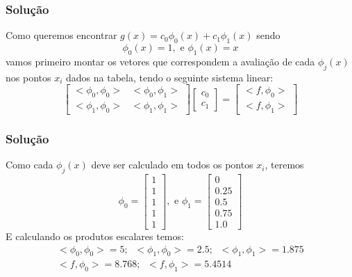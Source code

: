 \documentclass{beamer}
\theoremstyle{mystyle}
\begin{document}
	\begin{frame}
		\frametitle{Solução}
		Como queremos encontrar $ g(x) = c_{0}\phi_{0}(x) +c_{1}\phi_{1}(x) $ sendo
		\begin{equation*}
			\phi_{0}(x) = 1, \mbox{ e } \phi_{1}(x) = x
		\end{equation*}
		vamos primeiro montar os vetores que correspondem a avaliação de cada $ \phi_{j}(x) $ nos pontos $ x_{i} $ dados na tabela, tendo o seguinte sistema linear:
		\begin{equation*}
			\left[ \begin{array}{cc}
				<\phi_{0},\phi_{0}> & <\phi_{0},\phi_{1}> \\
				<\phi_{1},\phi_{0}> & <\phi_{1},\phi_{1}> 
			\end{array}\right]
			\left[ \begin{array}{c}
				c_{0}\\
				c_{1}
			\end{array} \right]
			= \left[ \begin{array}{c}
				<f,\phi_{0}>\\
				<f,\phi_{1}>
			\end{array} \right]
		\end{equation*}
	\end{frame}

	\begin{frame}
		\frametitle{Solução}
		Como cada $ \phi_{j}(x) $ deve ser calculado em todos os pontos $ x_{i} $, teremos 
		\begin{equation*}
			\phi_{0} = \left[ \begin{array}{c}
				1\\
				1\\
				1\\
				1\\
				1
			\end{array} \right], \mbox{ e } \phi_{1} = \left[ \begin{array}{c}
			0\\
			0.25\\
			0.5\\
			0.75\\
			1.0
		\end{array} \right]
		\end{equation*}
		E calculando os produtos escalares temos:
		\begin{gather*}
				<\phi_{0},\phi_{0}> = 5;\;\; <\phi_{1},\phi_{0}> = 2.5;\;\; <\phi_{1},\phi_{1}> = 1.875\\
				<f,\phi_{0}> = 8.768;\;\; <f,\phi_{1}> = 5.4514
		\end{gather*}
	\end{frame}
\end{document}
